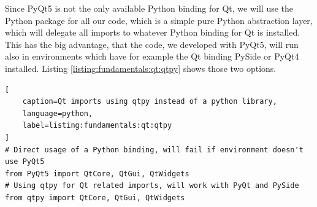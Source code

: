 Since PyQt5 is not the only available Python binding for Qt, we will use the Python package  for all our code, which is a simple pure Python abstraction layer, which will delegate all imports to whatever Python binding for Qt is installed. This has the big advantage, that the code, we developed with PyQt5, will run also in environments which have for example the Qt binding PySide or PyQt4 installed. Listing \ref{listing:fundamentals:qt:qtpy} shows those two options.

\begin{lstlisting}[
    caption=Qt imports using qtpy instead of a python library,
    language=python, 
    label=listing:fundamentals:qt:qtpy
]
# Direct usage of a Python binding, will fail if environment doesn't use PyQt5
from PyQt5 import QtCore, QtGui, QtWidgets
# Using qtpy for Qt related imports, will work with PyQt and PySide
from qtpy import QtCore, QtGui, QtWidgets
\end{lstlisting}
